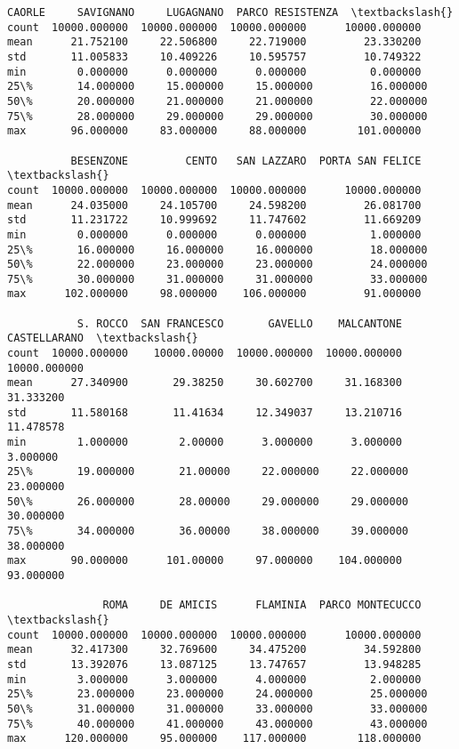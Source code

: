 \documentclass[11pt]{article}
\begin{document}
\begin{tcolorbox}[breakable, size=fbox, boxrule=.5pt, pad at break*=1mm, opacityfill=0]
\begin{Verbatim}[commandchars=\\\{\}]
             CAORLE     SAVIGNANO     LUGAGNANO  PARCO RESISTENZA  \textbackslash{}
count  10000.000000  10000.000000  10000.000000      10000.000000
mean      21.752100     22.506800     22.719000         23.330200
std       11.005833     10.409226     10.595757         10.749322
min        0.000000      0.000000      0.000000          0.000000
25\%       14.000000     15.000000     15.000000         16.000000
50\%       20.000000     21.000000     21.000000         22.000000
75\%       28.000000     29.000000     29.000000         30.000000
max       96.000000     83.000000     88.000000        101.000000

          BESENZONE         CENTO   SAN LAZZARO  PORTA SAN FELICE  \textbackslash{}
count  10000.000000  10000.000000  10000.000000      10000.000000
mean      24.035000     24.105700     24.598200         26.081700
std       11.231722     10.999692     11.747602         11.669209
min        0.000000      0.000000      0.000000          1.000000
25\%       16.000000     16.000000     16.000000         18.000000
50\%       22.000000     23.000000     23.000000         24.000000
75\%       30.000000     31.000000     31.000000         33.000000
max      102.000000     98.000000    106.000000         91.000000

           S. ROCCO  SAN FRANCESCO       GAVELLO    MALCANTONE  CASTELLARANO  \textbackslash{}
count  10000.000000    10000.00000  10000.000000  10000.000000  10000.000000
mean      27.340900       29.38250     30.602700     31.168300     31.333200
std       11.580168       11.41634     12.349037     13.210716     11.478578
min        1.000000        2.00000      3.000000      3.000000      3.000000
25\%       19.000000       21.00000     22.000000     22.000000     23.000000
50\%       26.000000       28.00000     29.000000     29.000000     30.000000
75\%       34.000000       36.00000     38.000000     39.000000     38.000000
max       90.000000      101.00000     97.000000    104.000000     93.000000

               ROMA     DE AMICIS      FLAMINIA  PARCO MONTECUCCO  \textbackslash{}
count  10000.000000  10000.000000  10000.000000      10000.000000
mean      32.417300     32.769600     34.475200         34.592800
std       13.392076     13.087125     13.747657         13.948285
min        3.000000      3.000000      4.000000          2.000000
25\%       23.000000     23.000000     24.000000         25.000000
50\%       31.000000     31.000000     33.000000         33.000000
75\%       40.000000     41.000000     43.000000         43.000000
max      120.000000     95.000000    117.000000        118.000000


\end{Verbatim}
\end{tcolorbox}
\end{document}
